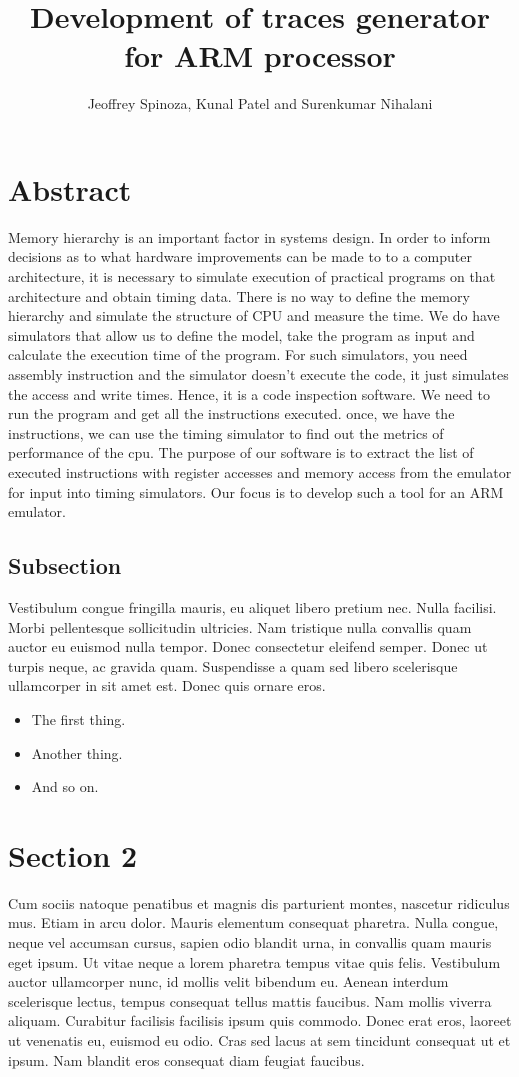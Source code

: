 \documentclass[letterpaper,11pt,twocolumn]{article}
\title{Development of traces generator for ARM processor}
\author{Jeoffrey Spinoza, Kunal Patel and Surenkumar Nihalani}
\begin{document}
\maketitle

\section{Abstract}
Memory hierarchy is an important factor in systems design. In order to inform decisions as to what hardware improvements can be made to to a computer architecture, it is necessary to simulate execution of practical programs on that architecture and obtain timing data. There is no way to define the memory hierarchy and simulate the structure of CPU and measure the time. We do have simulators that allow us to define the model, take the program as input and calculate the execution time of the program. For such simulators, you need assembly instruction and the simulator doesn't execute the code, it just simulates the access and write times. Hence, it is a code inspection software. We need to run the program and get all the instructions executed. once, we have the instructions, we can use the timing simulator to find out the metrics of performance of the cpu. The purpose of our software is to extract the list of executed instructions with register accesses and memory access from the emulator for input into timing simulators. Our focus is to develop such a tool for an ARM emulator.


\subsection{Subsection}
Vestibulum congue fringilla mauris, eu aliquet libero pretium nec. Nulla facilisi. Morbi pellentesque sollicitudin ultricies. Nam tristique nulla convallis quam auctor eu euismod nulla tempor. Donec consectetur eleifend semper. Donec ut turpis neque, ac gravida quam. Suspendisse a quam sed libero scelerisque ullamcorper in sit amet est. Donec quis ornare eros.

\begin{itemize}
  \item{The first thing.}
  \item{Another thing.}
  \item{And so on.}
\end{itemize}

\section{Section 2}
Cum sociis natoque penatibus et magnis dis parturient montes, nascetur ridiculus mus. Etiam in arcu dolor. Mauris elementum consequat pharetra. Nulla congue, neque vel accumsan cursus, sapien odio blandit urna, in convallis quam mauris eget ipsum. Ut vitae neque a lorem pharetra tempus vitae quis felis. Vestibulum auctor ullamcorper nunc, id mollis velit bibendum eu. Aenean interdum scelerisque lectus, tempus consequat tellus mattis faucibus. Nam mollis viverra aliquam. Curabitur facilisis facilisis ipsum quis commodo. Donec erat eros, laoreet ut venenatis eu, euismod eu odio. Cras sed lacus at sem tincidunt consequat ut et ipsum. Nam blandit eros consequat diam feugiat faucibus.
\end{document}
